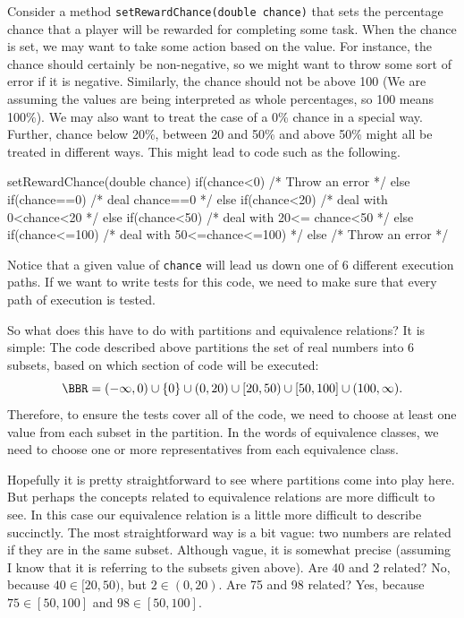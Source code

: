 \begin{exa}\label{exa:chance}
Consider a method \verb+setRewardChance(double chance)+ that sets the percentage chance that a player will
be rewarded for completing some task. 
When the chance is set, we may want to take some action based on the value.
For instance, the chance should certainly be non-negative, so we might want to throw some sort of error  
if it is negative. Similarly, the chance should not be above 100 (We are assuming the values are being interpreted 
as whole percentages, so 100 means 100\%). 
We may also want to treat the case of a 0\% chance in a special way. 
Further, chance below 20\%, between 20 and 50\% and above 50\% might all be treated in different ways.
This might lead to code such as the following.
\begin{code}
    setRewardChance(double chance) {
        if(chance<0)         { /* Throw an error */ }
        else if(chance==0)   { /* deal chance==0 */ }
        else if(chance<20)   { /* deal with 0<chance<20 */ }
        else if(chance<50)   { /* deal with 20<= chance<50 */ }
        else if(chance<=100) { /* deal with 50<=chance<=100) */ }
        else                 { /* Throw an error */ }
    }
\end{code}
Notice that a given value of \verb+chance+ will lead us down one of 6 different execution paths.
If we want to write tests for this code, we need to make sure that every path of execution is tested.

So what does this have to do with partitions and equivalence relations? It is simple: The code described
above partitions the set of real numbers into 6 subsets, based on which section of code will be executed:
$$\BBR=(-\infty,0)\cup\{0\}\cup(0,20)\cup[20,50)\cup[50,100]\cup(100,\infty).$$
Therefore, to ensure the tests cover all of the code, we need to choose at least one value from each subset in
the partition. In the words of equivalence classes, we need to choose one or more representatives from
each equivalence class.

Hopefully it is pretty straightforward to see where partitions come into play here. 
But perhaps the concepts related to equivalence relations are more difficult to see.
In this case our equivalence relation is a little more difficult to describe succinctly.  
The most straightforward way is a bit vague: two numbers are related if they are in the same subset.
Although vague, it is somewhat precise (assuming I know that it is referring to the subsets given above). 
Are 40 and 2 related? No, because $40\in[20,50)$, but $2\in(0,20)$.
Are 75 and 98 related? Yes, because $75\in[50,100]$ and $98\in [50,100]$.
\end{exa}

